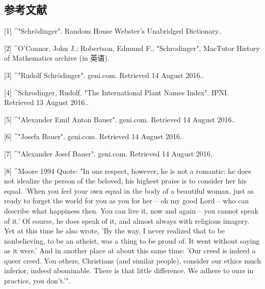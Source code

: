 \subsection{参考文献}
[1]
^"Schrödinger". Random House Webster's Unabridged Dictionary..

[2]
^O'Connor, John J.; Robertson, Edmund F., "Schrodinger", MacTutor History of Mathematics archive (in 英语).

[3]
^"Rudolf Schrödinger". geni.com. Retrieved 14 August 2016..

[4]
^Schrodinger, Rudolf. "The International Plant Names Index". IPNI. Retrieved 13 August 2016..

[5]
^"Alexander Emil Anton Bauer". geni.com. Retrieved 14 August 2016..

[6]
^"Josefa Bauer". geni.com. Retrieved 14 August 2016..

[7]
^"Alexander Josef Bauer". geni.com. Retrieved 14 August 2016..

[8]
^Moore 1994 Quote: "In one respect, however, he is not a romantic: he does not idealize the person of the beloved, his highest praise is to consider her his equal. 'When you feel your own equal in the body of a beautiful woman, just as ready to forget the world for you as you for her – oh my good Lord – who can describe what happiness then. You can live it, now and again – you cannot speak of it.' Of course, he does speak of it, and almost always with religious imagery. Yet at this time he also wrote, 'By the way, I never realized that to be nonbelieving, to be an atheist, was a thing to be proud of. It went without saying as it were.' And in another place at about this same time: 'Our creed is indeed a queer creed. You others, Christians (and similar people), consider our ethics much inferior, indeed abominable. There is that little difference. We adhere to ours in practice, you don't.'".

